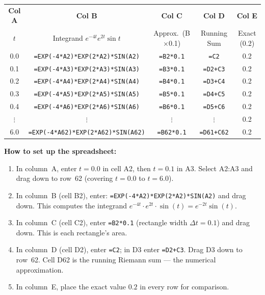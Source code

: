 \documentclass[12pt,a4paper]{article}
\begin{document}
\vspace{0.5em}
\begin{center}
\small
\begin{tabular}{@{}ccccc@{}}
\toprule
\textbf{Col A} & \textbf{Col B} & \textbf{Col C} & \textbf{Col D} & \textbf{Col E} \\
$t$ & Integrand $e^{-4t}e^{2t}\sin t$ & Approx.~(B$\times$0.1) & Running Sum & Exact (0.2) \\
\midrule
0.0 & \texttt{=EXP(-4*A2)*EXP(2*A2)*SIN(A2)} & \texttt{=B2*0.1} & \texttt{=C2} & 0.2 \\
0.1 & \texttt{=EXP(-4*A3)*EXP(2*A3)*SIN(A3)} & \texttt{=B3*0.1} & \texttt{=D2+C3} & 0.2 \\
0.2 & \texttt{=EXP(-4*A4)*EXP(2*A4)*SIN(A4)} & \texttt{=B4*0.1} & \texttt{=D3+C4} & 0.2 \\
0.3 & \texttt{=EXP(-4*A5)*EXP(2*A5)*SIN(A5)} & \texttt{=B5*0.1} & \texttt{=D4+C5} & 0.2 \\
0.4 & \texttt{=EXP(-4*A6)*EXP(2*A6)*SIN(A6)} & \texttt{=B6*0.1} & \texttt{=D5+C6} & 0.2 \\
$\vdots$ & $\vdots$ & $\vdots$ & $\vdots$ & 0.2 \\
6.0 & \texttt{=EXP(-4*A62)*EXP(2*A62)*SIN(A62)} & \texttt{=B62*0.1} & \texttt{=D61+C62} & 0.2 \\
\bottomrule
\end{tabular}
\end{center}
\vspace{0.5em}

\textbf{How to set up the spreadsheet:}
\begin{enumerate}
  \item In column~A, enter $t = 0.0$ in cell A2, then $t = 0.1$ in A3. Select A2:A3 and
        drag down to row~62 (covering $t = 0.0$ to $t = 6.0$).
  \item In column~B (cell B2), enter: \texttt{=EXP(-4*A2)*EXP(2*A2)*SIN(A2)} and drag down.
        This computes the integrand $e^{-4t}\cdot e^{2t}\cdot\sin(t) = e^{-2t}\sin(t)$.
  \item In column~C (cell C2), enter \texttt{=B2*0.1} (rectangle width $\Delta t = 0.1$)
        and drag down. This is each rectangle's area.
  \item In column~D (cell D2), enter \texttt{=C2}; in D3 enter \texttt{=D2+C3}. Drag D3 down
        to row~62. Cell D62 is the running Riemann sum --- the numerical approximation.
  \item In column~E, place the exact value $0.2$ in every row for comparison.
\end{enumerate}
\end{document}
